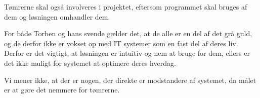 Tømrerne skal også involveres i projektet, eftersom programmet skal bruges af dem og løsningen omhandler dem.

For både Torben og hans svende gælder det, at de alle er en del af det grå guld, og de derfor ikke er vokset op med IT systemer som en fast del af deres liv.
Derfor er det vigtigt, at løsningen er intuitiv og nem at bruge for dem, ellers er det ikke muligt for systemet at optimere deres hverdag.

Vi mener ikke, at der er nogen, der direkte er modstandere af systemet, da målet er at gøre det nemmere for tømrerne.